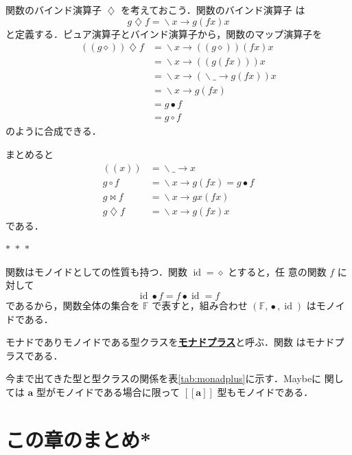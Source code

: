 \documentclass[a5paper,twoside,fleqn,draft]{jsbook}
\def\[{[\![}
\def\]{]\!]}
\newcommand{\separator}{\begin{center}$*$~$*$~$*$\end{center}}
\newcommand{\keyword}[1]{{\underline{\textbf{#1}}}}
\newcommand{\mAnonParam}{\diamond}
\newcommand{\mSpecialFunc}[1]{#1}
\DeclareMathOperator{\mId}{\mSpecialFunc{id}}
\DeclareMathOperator{\mAppMapFunc}{\bowtie}
\DeclareMathOperator{\mBindFunc}{\diamondsuit}
\DeclareMathOperator{\mComp}{\bullet}
\DeclareMathOperator{\mLambda}{\backslash}
\DeclareMathOperator{\mLambdaArrow}{\rightarrow}
\DeclareMathOperator{\mMapFunc}{\circ}
\newcommand{\mSpecialSet}[1]{\mathbb{#1}}
\newcommand{\mFSet}{\mSpecialSet{F}}
\newcommand{\mType}[1]{\mathbf{#1}} %
\newcommand{\mA}{\mType{a}}
\newcommand{\mTypeAssemble}[2]{{}^{\mType{#1}}\[\mType{#2}\]}
\newcommand{\mMaybeType}[1]{\[\mType{#1}\]}%
\newcommand{\mFuncWith}[1]{((#1))}  %
\newcommand{\mLambdaEXP}[2]{\mLambda{#1}\mLambdaArrow{#2}} %
\begin{document}
関数のバインド演算子 $\mBindFunc$ を考えておこう．関数のバインド演算子
は
\begin{equation}
g\mBindFunc f=\mLambdaEXP{x}{g(fx)x}
\end{equation}
と定義する．ピュア演算子とバインド演算子から，関数のマップ演算子を
\begin{align}
\mFuncWith{g\mAnonParam}\mBindFunc f
&=\mLambdaEXP{x}{\mFuncWith{g\mAnonParam}(fx)x}\\
&=\mLambdaEXP{x}{\mFuncWith{g(fx)}x}\\
&=\mLambdaEXP{x}{(\mLambdaEXP{\_}{g(fx)})x}\\
&=\mLambdaEXP{x}{g(fx)}\\
&=g\mComp f\\
&=g\mMapFunc f
\end{align}
のように合成できる．

まとめると
\begin{align}
\mFuncWith{x}&=\mLambdaEXP{\_}{x}\\
g\mMapFunc f&=\mLambdaEXP{x}{g(fx)}=g\mComp f\\
g\mAppMapFunc f&=\mLambdaEXP{x}{gx(fx)}\\
g\mBindFunc f&=\mLambdaEXP{x}{g(fx)x}
\end{align}
である．


\separator

関数はモノイドとしての性質も持つ．関数 $\mId=\mAnonParam$ とすると，任
意の関数 $f$ に対して
\begin{equation}
\mId\mComp f=f\mComp\mId=f
\end{equation}
であるから，関数全体の集合を $\mFSet$ で表すと，組み合わせ
$(\mFSet,\mComp,\mId)$ はモノイドである．

モナドでありモノイドである型クラスを\keyword{モナドプラス}と呼ぶ．関数
はモナドプラスである．

今まで出てきた型と型クラスの関係を表\ref{tab:monadplus}に示す．Maybeに
関しては $\mA $ 型がモノイドである場合に限って $\mMaybeType{a}$
型もモノイドである．

\section{この章のまとめ*}
\end{document}
